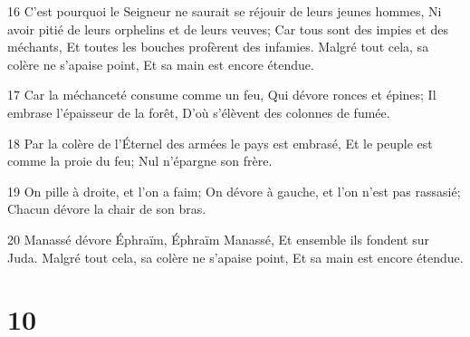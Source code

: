 \par 16 C'est pourquoi le Seigneur ne saurait se réjouir de leurs jeunes hommes, Ni avoir pitié de leurs orphelins et de leurs veuves; Car tous sont des impies et des méchants, Et toutes les bouches profèrent des infamies. Malgré tout cela, sa colère ne s'apaise point, Et sa main est encore étendue.
\par 17 Car la méchanceté consume comme un feu, Qui dévore ronces et épines; Il embrase l'épaisseur de la forêt, D'où s'élèvent des colonnes de fumée.
\par 18 Par la colère de l'Éternel des armées le pays est embrasé, Et le peuple est comme la proie du feu; Nul n'épargne son frère.
\par 19 On pille à droite, et l'on a faim; On dévore à gauche, et l'on n'est pas rassasié; Chacun dévore la chair de son bras.
\par 20 Manassé dévore Éphraïm, Éphraïm Manassé, Et ensemble ils fondent sur Juda. Malgré tout cela, sa colère ne s'apaise point, Et sa main est encore étendue.

\chapter{10}


